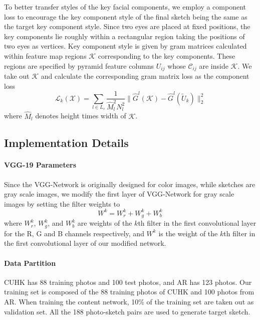 \documentclass[10pt,twocolumn,letterpaper]{article}
\begin{document}
To better transfer styles of the key facial components, we employ a component loss to encourage the key component style of the final sketch being the same as the target key component style. Since two eyes are placed at fixed positions, the key components lie roughly within a rectangular region taking the positions of two eyes as vertices. Key component style is given by gram matrices calculated within feature map regions $\mathcal K$ corresponding to the key components. These regions are specified by pyramid feature columns $U_{ij}$ whose $\mathcal{C}_{ij}$ are inside $\mathcal K$. We take out $\mathcal K$ and calculate the corresponding gram matrix loss as the component loss
\begin{equation}
\mathcal{L}_{k} ( \mathcal{X} ) = \sum\limits_{l \in {L_s}} {\frac{1}{{\hat{M}_l^2{N}_l^2}}\| {{{\hat G}^l}( \mathcal{K} ) - {\hat G}^l(\tilde{U}_k)} \|_2^2} 
\label{eq:component_loss}
\end{equation}
where $\hat{M}_l$ denotes height times width of $\mathcal K$. 

\subsection{Implementation Details}

\paragraph*{VGG-19 Parameters} Since the VGG-Network is originally designed for color images, while sketches are gray scale images, we modify the first layer of VGG-Network for gray scale images by setting the filter weights to
\begin{equation}
W^{k} = W^{k}_r+W^{k}_g+W^{k}_b
\label{eq:VGG_weights}
\end{equation}
where $W^{k}_r$, $W^{k}_g$, and $W^{k}_b$ are weights of the $k$th filter in the first convolutional layer for the R, G and B channels respectively, and $W^{k}$ is the weight of the $k$th filter in the first convolutional layer of our modified network.

\paragraph{Data Partition} CUHK has 88 training photos and 100 test photos, and AR has 123 photos. Our training set is composed of the 88 training photos of CUHK and 100 photos from AR. When training the content network, 10\% of the training set are taken out as validation set. All the 188 photo-sketch pairs are used to generate target sketch.
\end{document}
